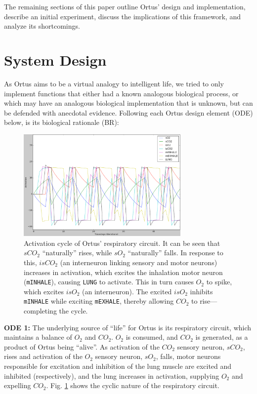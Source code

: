\documentclass[letterpaper]{article}
\begin{document}
The remaining sections of this paper outline Ortus' design and implementation, describe an initial experiment, discuss the implications of this framework, and analyze its shortcomings.

\section{System Design}


As Ortus aims to be a virtual analogy to intelligent life, we tried to only implement functions that either had a known analogous biological process, or which may have an analogous biological implementation that is unknown, but can be defended with anecdotal evidence. Following each Ortus design element (ODE) below, is its biological rationale (BR):


\begin{figure}
\begin{center}
\includegraphics[width=3.3in]{images/respiration.png}
\caption{Activation cycle of Ortus' respiratory circuit. It can be seen that $sCO_2$ ``naturally'' rises, while $sO_2$ ``naturally'' falls. In response to this, $isCO_2$ (an interneuron linking sensory and motor neurons) increases in activation, which excites the inhalation motor neuron (\texttt{mINHALE}), causing \texttt{LUNG} to activate. This in turn causes $O_2$ to spike, which excites $isO_2$ (an interneuron). The excited $isO_2$ inhibits \texttt{mINHALE} while exciting \texttt{mEXHALE}, thereby allowing $CO_2$ to rise---completing the cycle.}
\label{respiration}
\end{center}
\end{figure}


\textbf{ODE 1:} The underlying source of ``life'' for Ortus is its respiratory circuit, which maintains a balance of $O_2$ and $CO_2$. $O_2$ is consumed, and $CO_2$ is generated, as a product of Ortus being ``alive''. As activation of the $CO_2$ sensory neuron, $sCO_2$, rises and activation of the $O_2$ sensory neuron, $sO_2$, falls, motor neurons responsible for excitation and inhibition of the lung muscle are excited and inhibited (respectively), and the lung increases in activation, supplying $O_2$ and expelling $CO_2$. Fig. \ref{respiration} shows the cyclic nature of the respiratory circuit.
\end{document}
